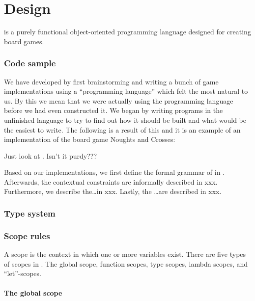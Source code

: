 \chapter{Design}
\label{chap:design}

\productname{} is a purely functional object-oriented programming language designed for creating
board games.

\subsection*{Code sample}

We have developed \productname{} by first brainstorming and writing a bunch of
game implementations using a ``programming language'' which felt the most
natural to us. By this we mean that we were actually using the programming
language before we had even constructed it. We began by writing programs in the
unfinished language to try to find out how it should be built and what would be
the easiest to write. The following is a result of this and it is an example of an
implementation of the board game Noughts and Crosses:


Just look at . Isn't it purdy???


Based on our implementations, we first define the formal grammar of
\productname{} in . Afterwards, the contextual constraints
are informally described  in xxx. Furthermore, we describe the\dots in xxx. Lastly, the 
\ldots are described in xxx.

\subsection*{Type system}



\subsection*{Scope rules}

A scope is the context in which one or more variables exist.
There are five types of scopes in \productname{}. The global scope,
function scopes, type scopes, lambda scopes, and ``let''-scopes.

\subsubsection{The global scope}

